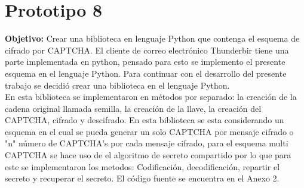 \section{Prototipo 8}
\textbf{Objetivo:} Crear una biblioteca en lenguaje Python que contenga el esquema de cifrado por CAPTCHA.
El cliente de correo electrónico Thunderbir tiene una parte implementada en python, pensado para esto se implemento el presente esquema en el lenguaje Python. Para continuar con el desarrollo del presente trabajo se decidió crear una biblioteca en el lenguaje Python.\\
En esta biblioteca se implementaron en métodos por separado: la creación de la cadena original llamada semilla, la creación de la llave, la creación del CAPTCHA, cifrado y descifrado.
En esta biblioteca se esta considerando un esquema en el cual se pueda generar un solo CAPTCHA por mensaje cifrado o "n" número de CAPTCHA's por cada mensaje cifrado, para el esquema multi CAPTCHA se hace uso de el algoritmo de secreto compartido por lo que para este se implementaron los metodos: Codificación, decodificación, repartir el secreto y recuperar el secreto. El código fuente se encuentra en el Anexo 2.
